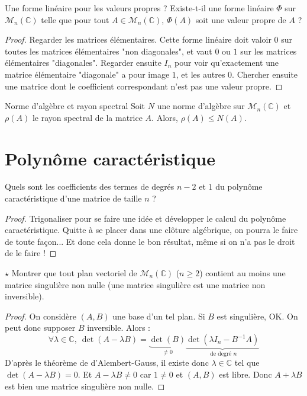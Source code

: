 \documentclass[french,a4paper]{article}
\newcommand{\C}{\mathbb{C}}
\newcommand{\inv}{^{-1}}
\theoremstyle{plain}
\theoremstyle{definition}
\theoremstyle{remark}
\begin{document}
\begin{ex}{Une forme linéaire pour les valeurs propres ?}
	Existe-t-il une forme linéaire $\Phi$ sur $\mathcal{M}_n(\C)$ telle que pour tout $A\in\mathcal{M}_n(\C)$, $\Phi(A)$ soit une valeur propre de $A$ ?
\end{ex}
\begin{proof}
	Regarder les matrices élémentaires. Cette forme linéaire doit valoir $0$ sur toutes les matrices élémentaires "non diagonales", et vaut $0$ ou $1$ sur les matrices élémentaires "diagonales". Regarder ensuite $I_n$ pour voir qu'exactement une matrice élémentaire "diagonale" a pour image $1$, et les autres $0$. Chercher ensuite une matrice dont le coefficient correspondant n'est pas une valeur propre.
\end{proof}

\begin{ex}{Norme d'algèbre et rayon spectral}
	Soit $N$ une norme d'algèbre sur $\mathcal{M}_n(\C)$ et $\rho(A)$ le rayon spectral de la matrice $A$. Alors, $\rho(A)\leqslant N(A)$.
\end{ex}

\section{Polynôme caractéristique}

\begin{ex}{}
	Quels sont les coefficients des termes de degrés $n-2$ et $1$ du polynôme caractéristique d'une matrice de taille $n$ ?
\end{ex}
\begin{proof}
	Trigonaliser pour se faire une idée et développer le calcul du polynôme caractéristique. Quitte à se placer dans une clôture algébrique, on pourra le faire de toute façon... Et donc cela donne le bon résultat, même si on n'a pas le droit de le faire !
\end{proof}

\begin{ex}{$\star$}
	Montrer que tout plan vectoriel de $\mathcal{M}_n(\C)$ ($n\geqslant 2$) contient au moins une matrice singulière non nulle (une matrice singulière est une matrice non inversible).
\end{ex}
\begin{proof}
	On considère $(A,B)$ une base d'un tel plan. Si $B$ est singulière, OK. On peut donc supposer $B$ inversible. Alors : $$\forall\lambda\in\C,\ \det(A-\lambda B)=\underbrace{\det(B)}_{\ne 0}\underbrace{\det(\lambda I_n-B\inv A)}_{\text{ de degré }n}$$ D'après le théorème de d'Alembert-Gauss, il existe donc $\lambda\in\C$ tel que $\det(A-\lambda B)=0$. Et $A-\lambda B\ne 0$ car $1\ne 0$ et $(A,B)$ est libre. Donc $A+\lambda B$ est bien une matrice singulière non nulle.
\end{proof}
\end{document}
